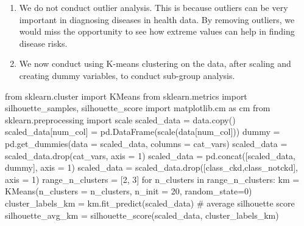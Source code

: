 \documentclass[
  11pt,
  letterpaper,
  DIV=11,
  numbers=noendperiod]{scrartcl}
\newenvironment{Shaded}{\begin{snugshade}}{\end{snugshade}}
\newcommand{\CommentTok}[1]{\textcolor[rgb]{0.37,0.37,0.37}{#1}}
\newcommand{\ControlFlowTok}[1]{\textcolor[rgb]{0.00,0.23,0.31}{#1}}
\newcommand{\DecValTok}[1]{\textcolor[rgb]{0.68,0.00,0.00}{#1}}
\newcommand{\ImportTok}[1]{\textcolor[rgb]{0.00,0.46,0.62}{#1}}
\newcommand{\KeywordTok}[1]{\textcolor[rgb]{0.00,0.23,0.31}{#1}}
\newcommand{\NormalTok}[1]{\textcolor[rgb]{0.00,0.23,0.31}{#1}}
\newcommand{\OperatorTok}[1]{\textcolor[rgb]{0.37,0.37,0.37}{#1}}
\newcommand{\StringTok}[1]{\textcolor[rgb]{0.13,0.47,0.30}{#1}}
\begin{document}
\begin{enumerate}
\def\labelenumi{\arabic{enumi}.}
\setcounter{enumi}{5}
\item
  We do not conduct outlier analysis. This is because outliers can be
  very important in diagnosing diseases in health data. By removing
  outliers, we would miss the opportunity to see how extreme values can
  help in finding disease risks.
\item
  We now conduct using K-means clustering on the data, after scaling and
  creating dummy variables, to conduct sub-group analysis.
\end{enumerate}

\begin{Shaded}
\begin{Highlighting}[]
\ImportTok{from}\NormalTok{ sklearn.cluster }\ImportTok{import}\NormalTok{ KMeans}
\ImportTok{from}\NormalTok{ sklearn.metrics }\ImportTok{import}\NormalTok{ silhouette\_samples, silhouette\_score}
\ImportTok{import}\NormalTok{ matplotlib.cm }\ImportTok{as}\NormalTok{ cm}
\ImportTok{from}\NormalTok{ sklearn.preprocessing }\ImportTok{import}\NormalTok{ scale}
\NormalTok{scaled\_data }\OperatorTok{=}\NormalTok{ data.copy()}
\NormalTok{scaled\_data[num\_col] }\OperatorTok{=}\NormalTok{ pd.DataFrame(scale(data[num\_col]))}
\NormalTok{dummy }\OperatorTok{=}\NormalTok{ pd.get\_dummies(data }\OperatorTok{=}\NormalTok{ scaled\_data, columns }\OperatorTok{=}\NormalTok{ cat\_vars)}
\NormalTok{scaled\_data }\OperatorTok{=}\NormalTok{ scaled\_data.drop(cat\_vars, axis }\OperatorTok{=} \DecValTok{1}\NormalTok{)}
\NormalTok{scaled\_data }\OperatorTok{=}\NormalTok{ pd.concat([scaled\_data, dummy], axis }\OperatorTok{=} \DecValTok{1}\NormalTok{)}
\NormalTok{scaled\_data }\OperatorTok{=}\NormalTok{ scaled\_data.drop([}\StringTok{\textquotesingle{}class\_ckd\textquotesingle{}}\NormalTok{,}\StringTok{\textquotesingle{}class\_notckd\textquotesingle{}}\NormalTok{], axis }\OperatorTok{=} \DecValTok{1}\NormalTok{)}
\NormalTok{range\_n\_clusters }\OperatorTok{=}\NormalTok{ [}\DecValTok{2}\NormalTok{, }\DecValTok{3}\NormalTok{]}
\ControlFlowTok{for}\NormalTok{ n\_clusters }\KeywordTok{in}\NormalTok{ range\_n\_clusters:}
\NormalTok{    km }\OperatorTok{=}\NormalTok{ KMeans(n\_clusters }\OperatorTok{=}\NormalTok{ n\_clusters, n\_init }\OperatorTok{=} \DecValTok{20}\NormalTok{, random\_state}\OperatorTok{=}\DecValTok{0}\NormalTok{)}
\NormalTok{    cluster\_labels\_km }\OperatorTok{=}\NormalTok{ km.fit\_predict(scaled\_data)}
    \CommentTok{\# average silhouette score}
\NormalTok{    silhouette\_avg\_km }\OperatorTok{=}\NormalTok{ silhouette\_score(scaled\_data, cluster\_labels\_km)}

\end{Highlighting}
\end{Shaded}
\end{document}
